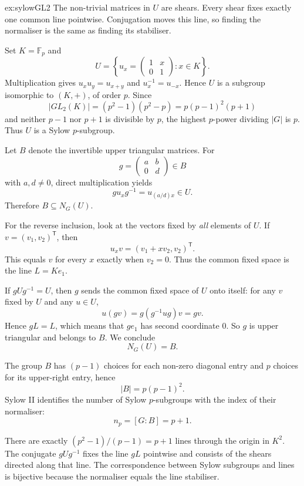 \begin{solution}{ex:sylowGL2}
\idea The non-trivial matrices in $U$ are shears. Every shear fixes exactly one common line pointwise. Conjugation moves this line, so finding the normaliser is the same as finding its stabiliser.

\writeup Set $K=\mathbb F_p$ and
\[
U=\left\{u_x=\begin{pmatrix}1&x\\0&1\end{pmatrix}:x\in K\right\}.
\]
Multiplication gives $u_xu_y=u_{x+y}$ and $u_x^{-1}=u_{-x}$. Hence $U$ is a subgroup isomorphic to $(K,+)$, of order $p$. Since
\[
|GL_2(K)|=(p^2-1)(p^2-p)
=p(p-1)^2(p+1)
\]
and neither $p-1$ nor $p+1$ is divisible by $p$, the highest $p$-power dividing $|G|$ is $p$. Thus $U$ is a Sylow $p$-subgroup.

Let $B$ denote the invertible upper triangular matrices. For
\[
g=\begin{pmatrix}a&b\\0&d\end{pmatrix}\in B
\]
with $a,d\ne0$, direct multiplication yields
\[
gu_xg^{-1}=u_{(a/d)x}\in U.
\]
Therefore $B\subseteq N_G(U)$.

For the reverse inclusion, look at the vectors fixed by \emph{all} elements of $U$. If $v=(v_1,v_2)^{\mathsf T}$, then
\[
u_xv=(v_1+xv_2,v_2)^{\mathsf T}.
\]
This equals $v$ for every $x$ exactly when $v_2=0$. Thus the common fixed space is the line $L=Ke_1$.

If $gUg^{-1}=U$, then $g$ sends the common fixed space of $U$ onto itself: for any $v$ fixed by $U$ and any $u\in U$,
\[
u(gv)=g(g^{-1}ug)v=gv.
\]
Hence $gL=L$, which means that $ge_1$ has second coordinate $0$. So $g$ is upper triangular and belongs to $B$. We conclude
\[
\boxed{N_G(U)=B}.
\]

The group $B$ has $(p-1)$ choices for each non-zero diagonal entry and $p$ choices for its upper-right entry, hence
\[
|B|=p(p-1)^2.
\]
Sylow II identifies the number of Sylow $p$-subgroups with the index of their normaliser:
\[
\boxed{n_p=[G:B]=p+1}.
\]

There are exactly $(p^2-1)/(p-1)=p+1$ lines through the origin in $K^2$. The conjugate $gUg^{-1}$ fixes the line $gL$ pointwise and consists of the shears directed along that line. The correspondence between Sylow subgroups and lines is bijective because the normaliser equals the line stabiliser.
\end{solution}

